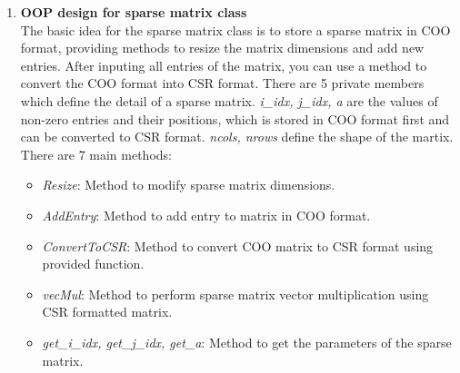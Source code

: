 \documentclass{article}
\begin{document}
\begin{enumerate}
\item \textbf{OOP design for sparse matrix class}\\
The basic idea for the sparse matrix class is to store a sparse matrix in COO format, providing methods to resize the matrix dimensions and add new entries. After inputing all entries of the matrix, you can use a method to convert the COO format into CSR format. There are 5 private members which define the detail of a sparse matrix. \emph{i\_idx, j\_idx, a} are the values of non-zero entries and their positions, which is stored in COO format first and can be converted to CSR format. \emph{ncols, nrows} define the shape of the martix. There are 7 main methods:
\begin{itemize}
\item{\emph{Resize}:} Method to modify sparse matrix dimensions.
\item{\emph{AddEntry}:} Method to add entry to matrix in COO format.
\item{\emph{ConvertToCSR}:} Method to convert COO matrix to CSR format using provided function.
\item{\emph{vecMul}:} Method to perform sparse matrix vector multiplication using CSR formatted matrix.
\item{\emph{get\_i\_idx, get\_j\_idx, get\_a}:} Method to get the parameters of the sparse matrix.\\
\end{itemize}



\end{enumerate}
\end{document}

